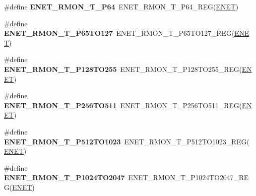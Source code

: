 \begin{DoxyCompactItemize}
\item 
\#define {\bfseries E\+N\+E\+T\+\_\+\+R\+M\+O\+N\+\_\+\+T\+\_\+\+P64}~E\+N\+E\+T\+\_\+\+R\+M\+O\+N\+\_\+\+T\+\_\+\+P64\+\_\+\+R\+EG(\hyperlink{group__ENET__Peripheral__Access__Layer_ga4745105f505f3ab949d6a57fbe2a0ed5}{E\+N\+ET})\hypertarget{group__ENET__Register__Accessor__Macros_ga55f52465e75b039a863770db93c2fddd}{}\label{group__ENET__Register__Accessor__Macros_ga55f52465e75b039a863770db93c2fddd}

\item 
\#define {\bfseries E\+N\+E\+T\+\_\+\+R\+M\+O\+N\+\_\+\+T\+\_\+\+P65\+T\+O127}~E\+N\+E\+T\+\_\+\+R\+M\+O\+N\+\_\+\+T\+\_\+\+P65\+T\+O127\+\_\+\+R\+EG(\hyperlink{group__ENET__Peripheral__Access__Layer_ga4745105f505f3ab949d6a57fbe2a0ed5}{E\+N\+ET})\hypertarget{group__ENET__Register__Accessor__Macros_ga76588cb610a5268fb112b219d3756934}{}\label{group__ENET__Register__Accessor__Macros_ga76588cb610a5268fb112b219d3756934}

\item 
\#define {\bfseries E\+N\+E\+T\+\_\+\+R\+M\+O\+N\+\_\+\+T\+\_\+\+P128\+T\+O255}~E\+N\+E\+T\+\_\+\+R\+M\+O\+N\+\_\+\+T\+\_\+\+P128\+T\+O255\+\_\+\+R\+EG(\hyperlink{group__ENET__Peripheral__Access__Layer_ga4745105f505f3ab949d6a57fbe2a0ed5}{E\+N\+ET})\hypertarget{group__ENET__Register__Accessor__Macros_ga46ecd6f991a973fb35eafaa7520edfa4}{}\label{group__ENET__Register__Accessor__Macros_ga46ecd6f991a973fb35eafaa7520edfa4}

\item 
\#define {\bfseries E\+N\+E\+T\+\_\+\+R\+M\+O\+N\+\_\+\+T\+\_\+\+P256\+T\+O511}~E\+N\+E\+T\+\_\+\+R\+M\+O\+N\+\_\+\+T\+\_\+\+P256\+T\+O511\+\_\+\+R\+EG(\hyperlink{group__ENET__Peripheral__Access__Layer_ga4745105f505f3ab949d6a57fbe2a0ed5}{E\+N\+ET})\hypertarget{group__ENET__Register__Accessor__Macros_ga6b5b079c08add074de625720273e711f}{}\label{group__ENET__Register__Accessor__Macros_ga6b5b079c08add074de625720273e711f}

\item 
\#define {\bfseries E\+N\+E\+T\+\_\+\+R\+M\+O\+N\+\_\+\+T\+\_\+\+P512\+T\+O1023}~E\+N\+E\+T\+\_\+\+R\+M\+O\+N\+\_\+\+T\+\_\+\+P512\+T\+O1023\+\_\+\+R\+EG(\hyperlink{group__ENET__Peripheral__Access__Layer_ga4745105f505f3ab949d6a57fbe2a0ed5}{E\+N\+ET})\hypertarget{group__ENET__Register__Accessor__Macros_ga9681a2de24b0515397a85b0c69d4e8df}{}\label{group__ENET__Register__Accessor__Macros_ga9681a2de24b0515397a85b0c69d4e8df}

\item 
\#define {\bfseries E\+N\+E\+T\+\_\+\+R\+M\+O\+N\+\_\+\+T\+\_\+\+P1024\+T\+O2047}~E\+N\+E\+T\+\_\+\+R\+M\+O\+N\+\_\+\+T\+\_\+\+P1024\+T\+O2047\+\_\+\+R\+EG(\hyperlink{group__ENET__Peripheral__Access__Layer_ga4745105f505f3ab949d6a57fbe2a0ed5}{E\+N\+ET})\hypertarget{group__ENET__Register__Accessor__Macros_ga64849c42635761d448ba9b92129ddf3c}{}\label{group__ENET__Register__Accessor__Macros_ga64849c42635761d448ba9b92129ddf3c}


\end{DoxyCompactItemize}

